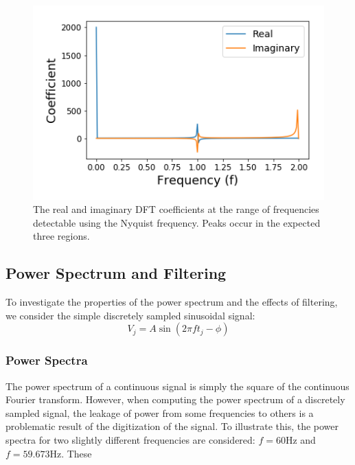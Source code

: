 \message{ !name(Assn2.tex)}\documentclass[twocolumn]{article}
\begin{document}
\begin{figure}
\centering
\includegraphics[width=\linewidth]{Coefficients}
\caption{The real and imaginary DFT coefficients at the range of frequencies detectable using the Nyquist frequency. Peaks occur in the expected three regions.}
\label{fig:Coefficients}
\end{figure}



\subsection{Power Spectrum and Filtering}
To investigate the properties of the power spectrum and the effects of
filtering, we consider the simple discretely sampled sinusoidal signal:
\begin{equation}
  V_j = A \sin(2 \pi f t_j - \phi)
  \label{eq:sine}
\end{equation}


\subsubsection{Power Spectra}
The power spectrum of a continuous signal is simply the square of the continuous
Fourier transform. However, when computing the power spectrum of a discretely
sampled signal, the leakage of power from some frequencies to others is a
problematic result of the digitization of the signal. To illustrate this, the
power spectra for two slightly different frequencies are considered: $f = 60$Hz
and $f = 59.673$Hz. These 
\end{document}
